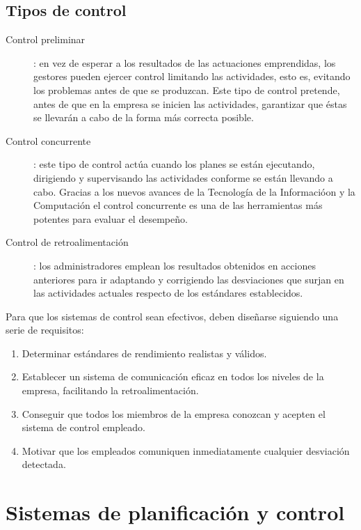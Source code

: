 \documentclass[12pt,a4paper,spanish]{report}
\begin{document}
		\subsection{\textcolor[rgb]{0.3,0.6,0.4}Tipos de control}
			\begin{description}
				\item[Control preliminar]: en vez de esperar a los resultados de las actuaciones emprendidas, los gestores pueden  ejercer control limitando las actividades, esto es, evitando los problemas antes de que se produzcan. Este tipo de control pretende, antes de que en la empresa se inicien las actividades, garantizar que éstas se llevarán a cabo de la forma más correcta posible.

				\item[Control concurrente]: este tipo de control actúa cuando los planes se están ejecutando, dirigiendo y supervisando las actividades conforme se están llevando a cabo. Gracias a los nuevos avances de la Tecnología de la Informacióon y la Computación el control concurrente es una de las herramientas más potentes para evaluar el desempeño.

				\item[Control de retroalimentación]: los administradores emplean los resultados obtenidos en acciones anteriores para ir adaptando y corrigiendo las desviaciones que surjan en las actividades actuales respecto de los estándares establecidos.
			\end{description}

			Para que los sistemas de control sean efectivos, deben diseñarse siguiendo una serie de requisitos:
			\begin{enumerate}[-]
				\item Determinar estándares de rendimiento realistas y válidos.
				\item Establecer un sistema de comunicación eficaz en todos los niveles de la empresa, facilitando la retroalimentación.
				\item Conseguir que todos los miembros de la empresa conozcan y acepten el sistema de control empleado.
				\item Motivar que los empleados comuniquen inmediatamente cualquier desviación detectada.
			\end{enumerate}

	\section{\textcolor[rgb]{0.3,0.6,0.4}Sistemas de planificación y control}
\end{document}
